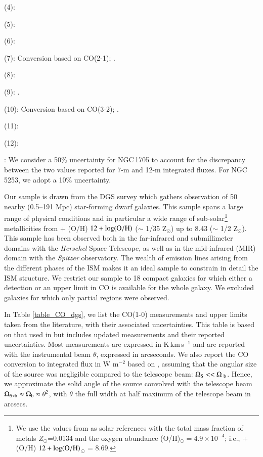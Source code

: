 \documentclass{aa}
\newcommand{\oh}{\ifmmode 12 + \log({\rm O/H}) \else$12 + \log({\rm O/H})$\fi}
\begin{document}
\begin{table}[t!]
\begin{threeparttable}
\begin{tablenotes}
   \item (4): \cite{Cormier_2014}
   \item (5): \cite{Kobulnicky_1995}
   \item (6): \cite{Young_1995}
   \item (7): Conversion based on CO(2-1); \cite{Zhou_co_2021}. 
   \item (8): \cite{Greve_1996}
   \item (9): \cite{Hunt_2023}. 
   \item (10): Conversion based on CO(3-2); \cite{Hunt_2014}. 
   \item (11): \cite{Sage_1992}
   \item (12): \cite{Leroy_2005}
   \item *: We consider a 50\% uncertainty for NGC\,1705 to account for the discrepancy between the two values reported for 7-m and 12-m integrated fluxes. For NGC\,5253, we adopt a 10\% uncertainty.
\end{tablenotes}

\end{threeparttable}
\end{table}

Our sample is drawn from the DGS survey \citep{Madden_2013} which gathers observation of 50 nearby (0.5--191 Mpc) star-forming dwarf galaxies. This sample spans a large range of physical conditions and in particular a wide range of sub-solar\footnote{We use the values from \cite{Asplund_2009} as solar references with the total mass fraction of metals $Z_{\odot}$=0.0134 and the oxygen abundance (O/H)$_{\odot} = 4.9 \times 10^{-4}$; i.e., \oh$_{\odot}$ = 8.69.} metallicities from \oh=7.14 ($\sim$ 1/35 Z$_\odot$) up to 8.43 ($\sim$ 1/2 Z$_\odot$).
This sample has been observed both in the far-infrared and submillimeter domains with the \textit{Herschel} Space Telescope, as well as in the mid-infrared (MIR) domain with the \textit{Spitzer} observatory. The wealth of emission lines arising from the different phases of the ISM makes it an ideal sample to constrain in detail the ISM structure. We restrict our sample to 18 compact galaxies for which either a detection or an upper limit in CO is available for the whole galaxy. We excluded galaxies for which only partial regions were observed. 

In Table \ref{table_CO_dgs}, we list the CO(1-0) measurements and upper limits taken from the literature, with their associated uncertainties. This table is based on that used in  but includes updated measurements and their reported uncertainties. Most measurements are expressed in K\,km\,s$^{-1}$ and are reported with the instrumental beam $\theta$, expressed in arcseconds. We also report the CO conversion to integrated flux in W m$^{-2}$ based on \cite{Solomon_1997}, assuming that the angular size of the source was negligible compared to the telescope beam: $\Omega_{\rm S} << \Omega_{\ \rm b}$. Hence, we approximate the solid angle of the source convolved with the telescope beam $\Omega_{\rm S * b} \approx \Omega_{\rm b} \approx \theta^2$, with $\theta$ the full width at half maximum of the telescope beam in arcsecs. 
\end{document}
